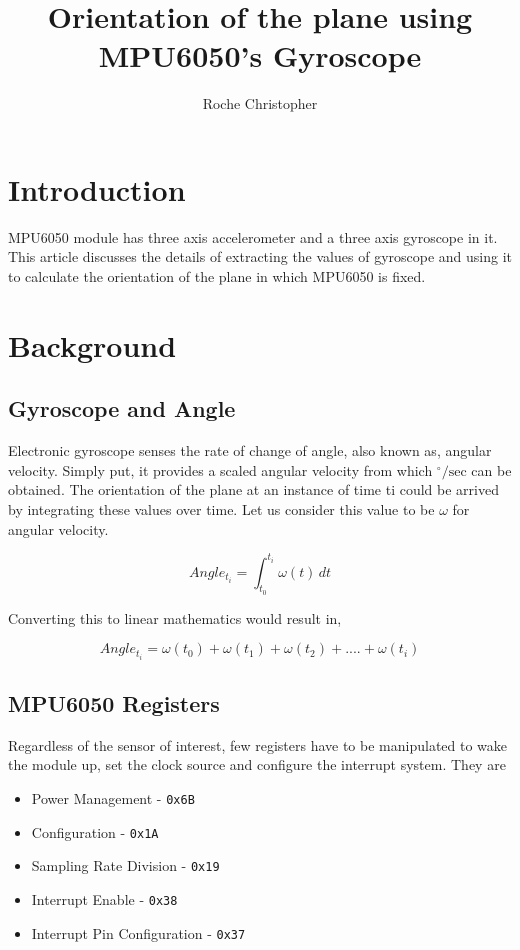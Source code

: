 \documentclass{article}
\title{Orientation of the plane using MPU6050's Gyroscope}
\author{Roche Christopher}
\begin{document}
	\maketitle
	\section{Introduction}
	MPU6050 module has three axis accelerometer and a three axis gyroscope in it. This article discusses the details of extracting the values of gyroscope and using it to calculate the orientation of the plane in which MPU6050 is fixed. 
	
	\section{Background}
	\label{sec:background}
	\subsection{Gyroscope and Angle}
	\label{sec:gyroscope}
	Electronic gyroscope senses the rate of change of angle, also known as, angular velocity. Simply put, it provides a scaled angular velocity from which $^\circ/\text{sec}$ can be obtained. The orientation of the plane at an instance of time ti could be arrived by integrating these values over time. Let us consider this value to be $\omega$ for angular velocity.
	
	$$ Angle_{t_i} = \int_{t_0}^{t_i} \omega(t) \, dt $$
	
	Converting this to linear mathematics would result in,
	
	$$ Angle_{t_i} = \omega(t_0) + \omega(t_1) + \omega(t_2) + .... + \omega(t_i) $$
	
	\subsection{MPU6050 Registers}
	\label{sec:registers}
	Regardless of the sensor of interest, few registers have to be manipulated to wake the module up, set the clock source and configure the interrupt system. They are 
	
	\begin{itemize}
		\item Power Management - \texttt{0x6B}
		\item Configuration - \texttt{0x1A}
		\item Sampling Rate Division - \texttt{0x19}
		\item Interrupt Enable - \texttt{0x38}
		\item Interrupt Pin Configuration - \texttt{0x37}
	\end{itemize}
\end{document}
